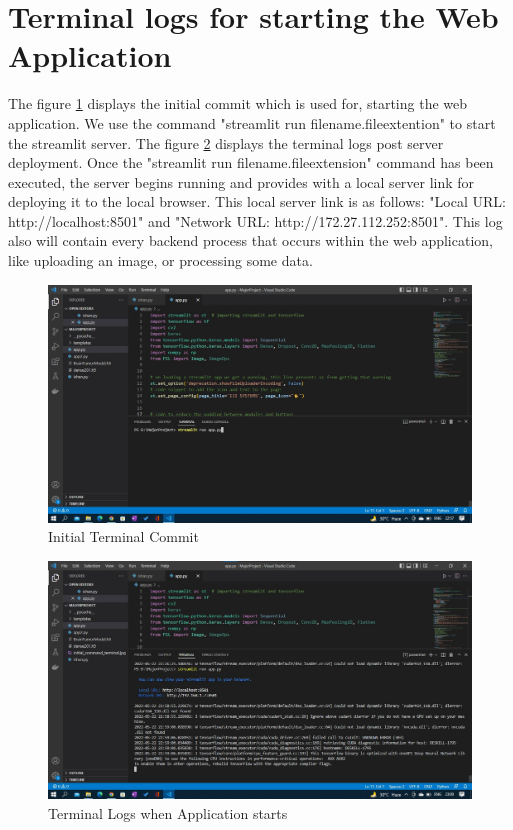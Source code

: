 \section{Terminal logs for starting the Web Application}
The figure \ref{fig:initial_commit} displays the initial commit which is used for, starting the web application. We use the command "streamlit run filename.fileextention" to start the streamlit server. The figure \ref{fig:terminal_log} displays the terminal logs post server deployment. Once the "streamlit run filename.fileextension" command has been executed, the server begins running and provides with a local server link for deploying it to the local browser. This local server link is as follows: "Local URL: http://localhost:8501" and "Network URL: http://172.27.112.252:8501". This log also will contain every backend process that occurs within the web application, like uploading an image, or processing some data.
\begin{figure}[H]
\includegraphics[scale=0.38]{Photos/Initial_command_terminal.jpg}
\caption{Initial Terminal Commit} \label{fig:initial_commit}
\end{figure}
\begin{figure}[H]
\includegraphics[scale=0.38]{Photos/Terminal_Logs_appStarts.jpg}
\caption{Terminal Logs when Application starts} \label{fig:terminal_log}
\end{figure}


